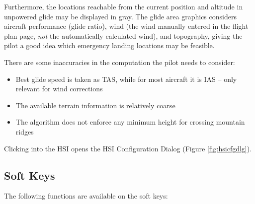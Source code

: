 \documentclass[a4paper,10pt,pdftex]{article}
\begin{document}
Furthermore, the locations reachable from the current position and
altitude in unpowered glide may be displayed in gray. The glide area
graphics considers aircraft performance (glide ratio), wind (the wind
manually entered in the flight plan page, \emph{not} the automatically
calculated wind), and topography, giving the pilot a good idea which
emergency landing locations may be feasible.

There are some inaccuracies in the computation the pilot needs to
consider:

\begin{itemize}
\item Best glide speed is taken as TAS, while for most aircraft it is
  IAS -- only relevant for wind corrections
\item The available terrain information is relatively coarse
\item The algorithm does not enforce any minimum height for crossing
  mountain ridges
\end{itemize}

Clicking into the HSI opens the HSI Configuration Dialog (Figure
\ref{fig:hsicfgdlg}).

\subsection{Soft Keys}

The following functions are available on the soft keys:
\end{document}
